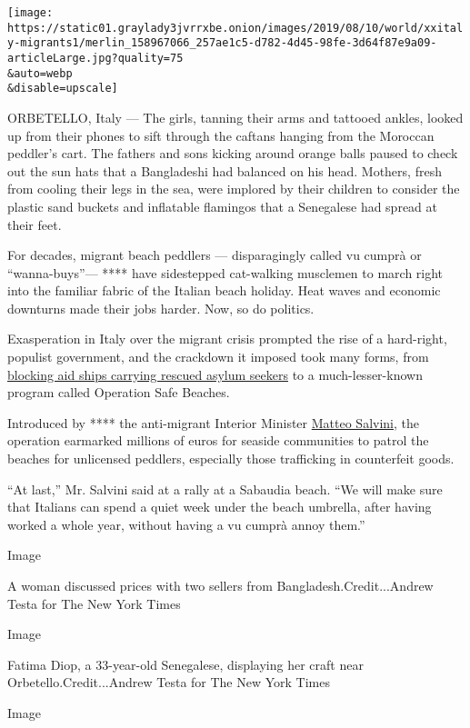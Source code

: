 \texttt{[image: https://static01.graylady3jvrrxbe.onion/images/2019/08/10/world/xxitaly-migrants1/merlin\_158967066\_257ae1c5-d782-4d45-98fe-3d64f87e9a09-articleLarge.jpg?quality=75\\\&auto=webp\\\&disable=upscale]}

ORBETELLO, Italy --- The girls, tanning their arms and tattooed ankles,
looked up from their phones to sift through the caftans hanging from the
Moroccan peddler's cart. The fathers and sons kicking around orange
balls paused to check out the sun hats that a Bangladeshi had balanced
on his head. Mothers, fresh from cooling their legs in the sea, were
implored by their children to consider the plastic sand buckets and
inflatable flamingos that a Senegalese had spread at their feet.

For decades, migrant beach peddlers --- disparagingly called vu cumprà
or ``wanna-buys''--- **** have sidestepped cat-walking musclemen to
march right into the familiar fabric of the Italian beach holiday. Heat
waves and economic downturns made their jobs harder. Now, so do
politics.

Exasperation in Italy over the migrant crisis prompted the rise of a
hard-right, populist government, and the crackdown it imposed took many
forms, from
\href{https://www.nytimes3xbfgragh.onion/2019/02/01/world/europe/italy-mayors-migrants-salvini-security-decree.html}{blocking
aid ships carrying rescued asylum seekers} to a much-lesser-known
program called Operation Safe Beaches.

Introduced by **** the anti-migrant Interior Minister
\href{https://www.nytimes3xbfgragh.onion/2019/08/08/world/europe/matteo-salvini-italy-beach.html}{Matteo
Salvini}, the operation earmarked millions of euros for seaside
communities to patrol the beaches for unlicensed peddlers, especially
those trafficking in counterfeit goods.

``At last,'' Mr. Salvini said at a rally at a Sabaudia beach. ``We will
make sure that Italians can spend a quiet week under the beach umbrella,
after having worked a whole year, without having a vu cumprà annoy
them.''

Image

A woman discussed prices with two sellers from
Bangladesh.Credit...Andrew Testa for The New York Times

Image

Fatima Diop, a 33-year-old Senegalese, displaying her craft near
Orbetello.Credit...Andrew Testa for The New York Times

Image

